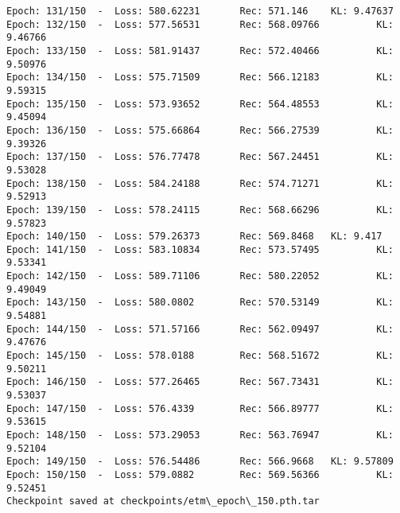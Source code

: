 \documentclass[11pt]{article}
\begin{document}
\begin{Verbatim}[commandchars=\\\{\}]
Epoch: 131/150  -  Loss: 580.62231       Rec: 571.146    KL: 9.47637
Epoch: 132/150  -  Loss: 577.56531       Rec: 568.09766          KL: 9.46766
Epoch: 133/150  -  Loss: 581.91437       Rec: 572.40466          KL: 9.50976
Epoch: 134/150  -  Loss: 575.71509       Rec: 566.12183          KL: 9.59315
Epoch: 135/150  -  Loss: 573.93652       Rec: 564.48553          KL: 9.45094
Epoch: 136/150  -  Loss: 575.66864       Rec: 566.27539          KL: 9.39326
Epoch: 137/150  -  Loss: 576.77478       Rec: 567.24451          KL: 9.53028
Epoch: 138/150  -  Loss: 584.24188       Rec: 574.71271          KL: 9.52913
Epoch: 139/150  -  Loss: 578.24115       Rec: 568.66296          KL: 9.57823
Epoch: 140/150  -  Loss: 579.26373       Rec: 569.8468   KL: 9.417
Epoch: 141/150  -  Loss: 583.10834       Rec: 573.57495          KL: 9.53341
Epoch: 142/150  -  Loss: 589.71106       Rec: 580.22052          KL: 9.49049
Epoch: 143/150  -  Loss: 580.0802        Rec: 570.53149          KL: 9.54881
Epoch: 144/150  -  Loss: 571.57166       Rec: 562.09497          KL: 9.47676
Epoch: 145/150  -  Loss: 578.0188        Rec: 568.51672          KL: 9.50211
Epoch: 146/150  -  Loss: 577.26465       Rec: 567.73431          KL: 9.53037
Epoch: 147/150  -  Loss: 576.4339        Rec: 566.89777          KL: 9.53615
Epoch: 148/150  -  Loss: 573.29053       Rec: 563.76947          KL: 9.52104
Epoch: 149/150  -  Loss: 576.54486       Rec: 566.9668   KL: 9.57809
Epoch: 150/150  -  Loss: 579.0882        Rec: 569.56366          KL: 9.52451
Checkpoint saved at checkpoints/etm\_epoch\_150.pth.tar
\end{Verbatim}

    \begin{center}
    \end{center}
    { \hspace*{\fill} \\}
    
    \begin{center}
    \end{center}
    { \hspace*{\fill} \\}
    
\end{document}
